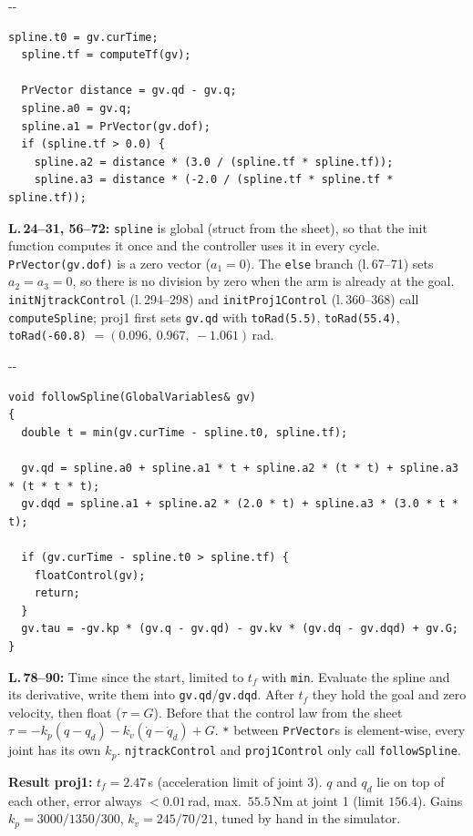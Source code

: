 \documentclass[10pt,a4paper]{article}
\makeatletter
\newcommand{\secneed}[1]{\par\penalty\@M\begingroup\setlength{\dimen@}{#1}\dimen@ii\pagegoal
  \advance\dimen@ii-\pagetotal\ifdim\dimen@>\dimen@ii\ifdim\dimen@ii>\z@\vfil\fi\penalty-\@M\fi\endgroup}
\newcommand{\code}[1]{\texttt{#1}}
\makeatother
\begin{document}
\secneed{10\baselineskip}
\begin{lstlisting}[firstnumber=58]
  spline.t0 = gv.curTime;
  spline.tf = computeTf(gv);

  PrVector distance = gv.qd - gv.q;
  spline.a0 = gv.q;
  spline.a1 = PrVector(gv.dof);
  if (spline.tf > 0.0) {
    spline.a2 = distance * (3.0 / (spline.tf * spline.tf));
    spline.a3 = distance * (-2.0 / (spline.tf * spline.tf * spline.tf));
\end{lstlisting}
\textbf{L.\,24--31, 56--72:} \code{spline} is global (struct from the sheet), so that the init function computes it once
and the controller uses it in every cycle. \code{PrVector(gv.dof)} is a zero vector ($a_1 = 0$). The \code{else} branch
(l.\,67--71) sets $a_2 = a_3 = 0$, so there is no division by zero when the arm is already at the goal.
\code{initNjtrackControl} (l.\,294--298) and \code{initProj1Control} (l.\,360--368) call \code{computeSpline}; proj1 first
sets \code{gv.qd} with \code{toRad(5.5)}, \code{toRad(55.4)}, \code{toRad(-60.8)} $= (0.096,\ 0.967,\ -1.061)$\,rad.

\secneed{13\baselineskip}
\begin{lstlisting}[firstnumber=78]
void followSpline(GlobalVariables& gv)
{
  double t = min(gv.curTime - spline.t0, spline.tf);

  gv.qd = spline.a0 + spline.a1 * t + spline.a2 * (t * t) + spline.a3 * (t * t * t);
  gv.dqd = spline.a1 + spline.a2 * (2.0 * t) + spline.a3 * (3.0 * t * t);

  if (gv.curTime - spline.t0 > spline.tf) {
    floatControl(gv);
    return;
  }
  gv.tau = -gv.kp * (gv.q - gv.qd) - gv.kv * (gv.dq - gv.dqd) + gv.G;
}
\end{lstlisting}
\textbf{L.\,78--90:} Time since the start, limited to $t_f$ with \code{min}. Evaluate the spline and its
derivative, write them into \code{gv.qd}/\code{gv.dqd}. After $t_f$ they hold the goal and zero velocity, then float ($\tau = G$). Before that the control law from the sheet
$\tau = -k_p(q - q_d) - k_v(\dot q - \dot q_d) + G$. \code{*} between \code{PrVector}s is element-wise, every joint has
its own $k_p$. \code{njtrackControl} and \code{proj1Control} only call \code{followSpline}.

\textbf{Result proj1:} $t_f = 2.47$\,s (acceleration limit of joint 3). $q$ and $q_d$ lie on top of each other, error
always $< 0.01$\,rad, max.\ $55.5$\,Nm at joint 1 (limit $156.4$). Gains $k_p = 3000/1350/300$, $k_v = 245/70/21$, tuned
by hand in the simulator.
\end{document}
